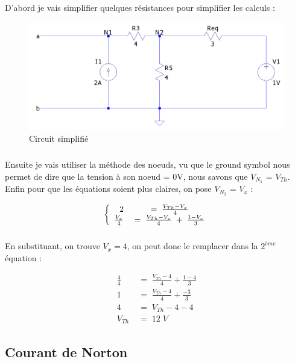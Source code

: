        \subparagraph{}D'abord je vais simplifier quelques résistances pour simplifier les calculs :
        
        \begin{figure}[H]
            \centering
            \includegraphics[width=\textwidth]{../pictures/simple.png}
            \caption{Circuit simplifié}
            \label{simple}
        \end{figure}
        
        \subparagraph{}Ensuite je vais utiliser la méthode des noeuds, vu que le ground symbol nous permet de dire que la tension à son noeud = 0V, nous savons que $V_{N_1}$ = $V_{Th}$. Enfin pour que les équations soient plus claires, on pose $V_{N_2}$ = $V_x$ :
        
            \begin{equation*}
            \left \{
               \begin{array}{r c l}
                  2\;&=\;\frac{V_{Th} - V_x}{4} \\
                  \frac{V_x}{4}\;&=\;\frac{V_{Th} - V_x}{4}\;+\;\frac{1 - V_x}{3}
               \end{array}
           \right .
        \end{equation*}
        
        \subparagraph{}En substituant, on trouve $V_x = 4$, on peut donc le remplacer dans la $2^{ème}$ équation :
        
            \begin{align*}
                \frac{4}{4}\;&=\;\frac{V_{Th}-4}{4} + \frac{1 - 4}{3} \\
                1\;&=\;\frac{V_{Th}-4}{4} + \frac{-3}{3} \\
                4\;&=\;V_{Th} - 4 -4 \\
                V_{Th}\;&=\;12\;V
            \end{align*}
            
            
    \subsection{Courant de Norton}
    
